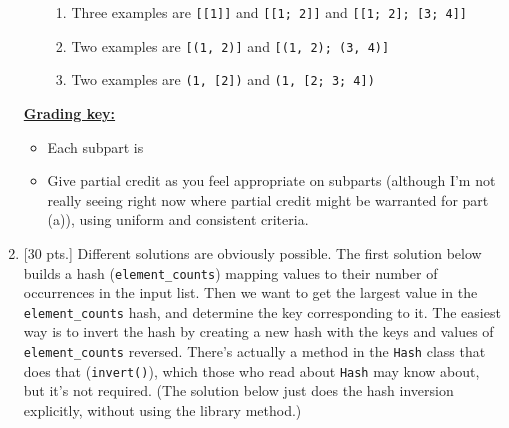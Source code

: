 \documentclass[11pt,fleqn]{article}
\begin{document}
\begin{enumerate}
\begin{enumerate}
\begin{enumerate}
                    \item Three examples are \texttt{[[1]]} and
                          \texttt{[[1; 2]]} and \texttt{[[1; 2]; [3; 4]]}

                    \item Two examples are \texttt{[(1, 2)]} and
                          \texttt{[(1, 2); (3, 4)]}

                    \item Two examples are \texttt{(1, [2])} and
                          \texttt{(1, [2; 3; 4])}

                  \end{enumerate}

          \end{enumerate}

          \begin{info}{\textbf{\underline{Grading key:}}}

            \smallskip

            \begin{itemize}

              \addtolength{\itemsep}{2mm}

              \item Each subpart is 

              \item Give partial credit as you feel appropriate on
                    subparts (although I'm not really seeing right now where
                    partial credit might be warranted for part (a)), using
                    uniform and consistent criteria.

            \end{itemize}

          \end{info}


    \item {[30 pts.]} Different solutions are obviously possible.  The first
          solution below builds a hash (\texttt{element\_counts}) mapping values
          to their number of occurrences in the input list.  Then we want to
          get the largest value in the \texttt{element\_counts} hash, and
          determine the key corresponding to it.  The easiest way is to
          invert the hash by creating a new hash with the keys and values of
          \texttt{element\_counts} reversed.  There's actually a method in
          the \texttt{Hash} class that does that (\texttt{invert()}), which
          those who read about \texttt{Hash} may know about, but it's not
          required.  (The solution below just does the hash inversion
          explicitly, without using the library method.)


\end{enumerate}
\end{document}
